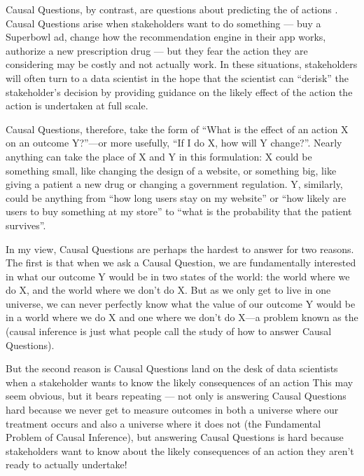 \documentclass[letterpaper,10pt,english]{jupyterBook}
\begin{document}
\sphinxAtStartPar
Causal Questions, by contrast, are questions about predicting the  of actions . Causal Questions arise when stakeholders want to do something — buy a Superbowl ad, change how the recommendation engine in their app works, authorize a new prescription drug — but they fear the action they are considering may be costly and not actually work. In these situations, stakeholders will often turn to a data scientist in the hope that the scientist can “de\sphinxhyphen{}risk” the stakeholder’s decision by providing guidance on the likely effect of the action  the action is undertaken at full scale.

\sphinxAtStartPar
Causal Questions, therefore, take the form of “What is the effect of an action X on an outcome Y?”—or more usefully, “If I do X, how will Y change?”. Nearly anything can take the place of X and Y in this formulation: X could be something small, like changing the design of a website, or something big, like giving a patient a new drug or changing a government regulation. Y, similarly, could be anything from “how long users stay on my website” or “how likely are users to buy something at my store” to “what is the probability that the patient survives”.

\sphinxAtStartPar
In my view, Causal Questions are perhaps the hardest to answer for two reasons. The first is that when we ask a Causal Question, we are fundamentally interested in  what our outcome Y would be in two states of the world: the world where we do X, and the world where we don’t do X. But as we only get to live in one universe, we can never perfectly know what the value of our outcome Y would be in  a world where we do X and one where we don’t do X—a problem known as the  (causal inference is just what people call the study of how to answer Causal Questions).

\sphinxAtStartPar
But the second reason is Causal Questions land on the desk of data scientists when a stakeholder wants to know the likely consequences of an action  This may seem obvious, but it bears repeating — not only is answering Causal Questions hard because we never get to measure outcomes in both a universe where our treatment occurs and also a universe where it does not (the Fundamental Problem of Causal Inference), but answering Causal Questions is  hard because stakeholders want to know about the likely consequences of an action they aren’t ready to actually undertake!
\end{document}
